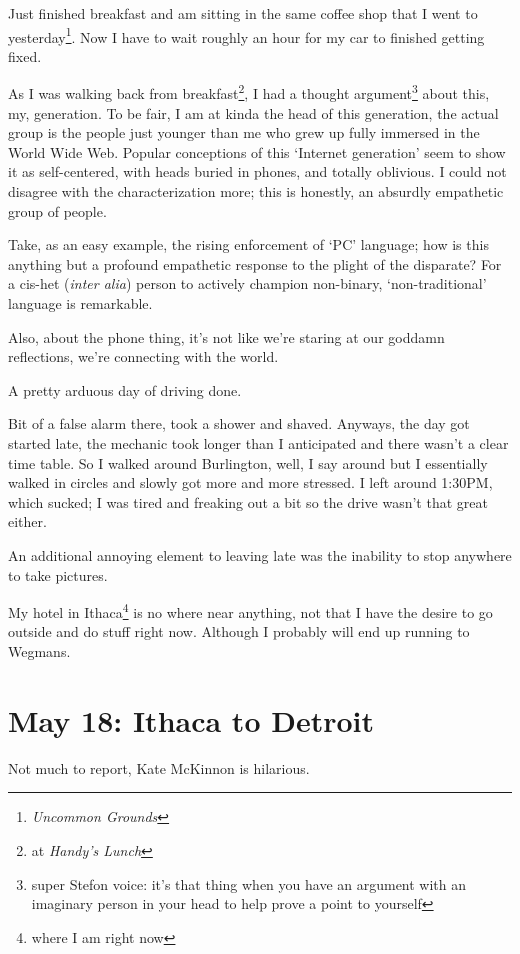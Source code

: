 \documentclass[../butidigress.tex]{subfiles}
\begin{document}
\entryskip

Just finished breakfast and am sitting in the same coffee shop that I went to yesterday\footnote{\textit{Uncommon Grounds}}.
Now I have to wait roughly an hour for my car to finished getting fixed.

As I was walking back from breakfast\footnote{at \textit{Handy's Lunch}}, I had a thought argument\footnote{super Stefon voice: it's that thing when you have an argument with an imaginary person in your head to help prove a point to yourself} about this, my, generation.
To be fair, I am at kinda the head of this generation, the actual group is the people just younger than me who grew up fully immersed in the World Wide Web.
Popular conceptions of this `Internet generation' seem to show it as self-centered, with heads buried in phones, and totally oblivious.
I could not disagree with the characterization more; this is honestly, an absurdly empathetic group of people.

Take, as an easy example, the rising enforcement of `PC' language; how is this anything but a profound empathetic response to the plight of the disparate?
For a cis-het (\textit{inter alia}) person to actively champion non-binary, `non-traditional' language is remarkable.

Also, about the phone thing, it's not like we're staring at our goddamn reflections, we're connecting with the world.

\entryskip

A pretty arduous day of driving done.

\entryskip

Bit of a false alarm there, took a shower and shaved.
Anyways, the day got started late, the mechanic took longer than I anticipated and there wasn't a clear time table.
So I walked around Burlington, well, I say around but I essentially walked in circles and slowly got more and more stressed.
I left around 1:30PM, which sucked; I was tired and freaking out a bit so the drive wasn't that great either.

An additional annoying element to leaving late was the inability to stop anywhere to take pictures.

My hotel in Ithaca\footnote{where I am right now} is no where near anything, not that I have the desire to go outside and do stuff right now.
Although I probably will end up running to Wegmans.

\section{May 18: Ithaca to Detroit}
Not much to report, Kate McKinnon is hilarious.
\end{document}
